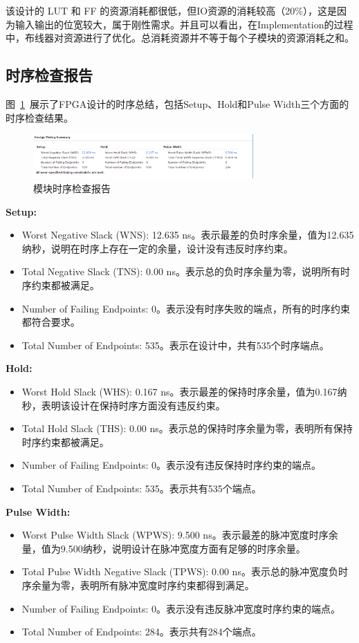 该设计的 LUT 和 FF 的资源消耗都很低，但IO资源的消耗较高（20\%），这是因为输入输出的位宽较大，属于刚性需求。并且可以看出，在Implementation的过程中，布线器对资源进行了优化。总消耗资源并不等于每个子模块的资源消耗之和。

\subsection{时序检查报告}

图~\ref{fig:exp6:timing}~展示了FPGA设计的时序总结，包括Setup、Hold和Pulse Width三个方面的时序检查结果。

\begin{figure}[htbp]
  \centering
  \includegraphics[width=0.75\textwidth]{figure/exp6/timing_summary.png}
  \caption{模块时序检查报告}
  \label{fig:exp6:timing}
\end{figure}


\textbf{Setup:}  
\begin{itemize}
  \item Worst Negative Slack (WNS): 12.635 ns。表示最差的负时序余量，值为12.635纳秒，说明在时序上存在一定的余量，设计没有违反时序约束。  
\item Total Negative Slack (TNS): 0.00 ns。表示总的负时序余量为零，说明所有时序约束都被满足。  
\item Number of Failing Endpoints: 0。表示没有时序失败的端点，所有的时序约束都符合要求。  
\item Total Number of Endpoints: 535。表示在设计中，共有535个时序端点。
\end{itemize}


\textbf{Hold:}  
\begin{itemize}
\item Worst Hold Slack (WHS): 0.167 ns。表示最差的保持时序余量，值为0.167纳秒，表明该设计在保持时序方面没有违反约束。  
\item Total Hold Slack (THS): 0.00 ns。表示总的保持时序余量为零，表明所有保持时序约束都被满足。  
\item Number of Failing Endpoints: 0。表示没有违反保持时序约束的端点。  
\item Total Number of Endpoints: 535。表示共有535个端点。
\end{itemize}

\textbf{Pulse Width:}  
\begin{itemize}
  \item Worst Pulse Width Slack (WPWS): 9.500 ns。表示最差的脉冲宽度时序余量，值为9.500纳秒，说明设计在脉冲宽度方面有足够的时序余量。  
  \item Total Pulse Width Negative Slack (TPWS): 0.00 ns。表示总的脉冲宽度负时序余量为零，表明所有脉冲宽度时序约束都得到满足。  
  \item Number of Failing Endpoints: 0。表示没有违反脉冲宽度时序约束的端点。  
\item Total Number of Endpoints: 284。表示共有284个端点。
\end{itemize}


